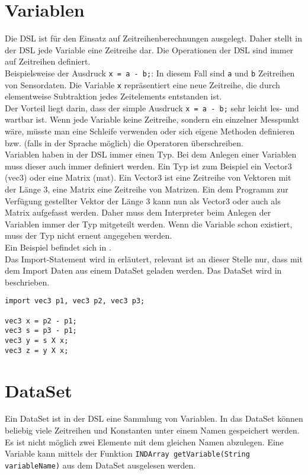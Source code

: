 \section{Variablen}
Die \ac{DSL} ist für den Einsatz auf Zeitreihenberechnungen ausgelegt.
Daher stellt in der \ac{DSL} jede Variable eine Zeitreihe dar.
Die Operationen der \ac{DSL} sind immer auf Zeitreihen definiert.\\
Beispielsweise der Ausdruck \texttt{x = a - b;}:
In diesem Fall sind \texttt{a} und \texttt{b} Zeitreihen von Sensordaten.
Die Variable \texttt{x} repräsentiert eine neue Zeitreihe, die durch elementweise Subtraktion jedes Zeitelements entstanden ist.\\
Der Vorteil liegt darin, dass der simple Ausdruck \texttt{x = a - b;} sehr leicht les- und wartbar ist.
Wenn jede Variable keine Zeitreihe, sondern ein einzelner Messpunkt wäre, müsste man eine Schleife verwenden oder sich eigene Methoden definieren bzw. (falls in der Sprache möglich) die Operatoren überschreiben.\\
Variablen haben in der \ac{DSL} immer einen Typ.
Bei dem Anlegen einer Variablen muss dieser auch immer definiert werden.
Ein Typ ist zum Beispiel ein Vector3 (vec3) oder eine Matrix (mat).
Ein Vector3 ist eine Zeitreihe von Vektoren mit der Länge 3, eine Matrix eine Zeitreihe von Matrizen.
Ein dem Programm zur Verfügung gestellter Vektor der Länge 3 kann nun als Vector3 oder auch als Matrix aufgefasst werden.
Daher muss dem Interpreter beim Anlegen der Variablen immer der Typ mitgeteilt werden.
Wenn die Variable schon existiert, muss der Typ nicht erneut angegeben werden.\\
Ein Beispiel befindet sich in .\\
Das Import-Statement wird in  erläutert, relevant ist an dieser Stelle nur, dass mit dem Import Daten aus einem DataSet geladen werden.
Das DataSet wird in  beschrieben.

\begin{lstlisting}[language=prepro, label={lst:Bsp_Variablenzuweisung}, caption={Beispiel Variablenzuweisung}, captionpos=b]
import vec3 p1, vec3 p2, vec3 p3;

vec3 x = p2 - p1;
vec3 s = p3 - p1;
vec3 y = s X x;
vec3 z = y X x;
\end{lstlisting}

\section{DataSet}
Ein DataSet ist in der \ac{DSL} eine Sammlung von Variablen.
In das DataSet können beliebig viele Zeitreihen und Konstanten unter einem Namen gespeichert werden.
Es ist nicht möglich zwei Elemente mit dem gleichen Namen abzulegen.
Eine Variable kann mittels der Funktion \texttt{INDArray getVariable(String variableName)} aus dem DataSet ausgelesen werden.

